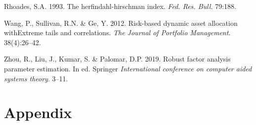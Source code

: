 \documentclass[11pt,preprint, authoryear]{elsarticle}
\numberwithin{equation}{section}
\numberwithin{figure}{section}
\numberwithin{table}{section}
\begin{document}
\leavevmode\hypertarget{ref-rhoades1993}{}%
Rhoades, S.A. 1993. The herfindahl-hirschman index. \emph{Fed. Res.
Bull.} 79:188.

\leavevmode\hypertarget{ref-wang2012}{}%
Wang, P., Sullivan, R.N. \& Ge, Y. 2012. Risk-based dynamic asset
allocation withExtreme tails and correlations. \emph{The Journal of
Portfolio Management}. 38(4):26--42.

\leavevmode\hypertarget{ref-zhou2019}{}%
Zhou, R., Liu, J., Kumar, S. \& Palomar, D.P. 2019. Robust factor
analysis parameter estimation. In ed. Springer \emph{International
conference on computer aided systems theory}. 3--11.

\newpage

\hypertarget{appendix}{%
\section*{Appendix}\label{appendix}}
\end{document}
